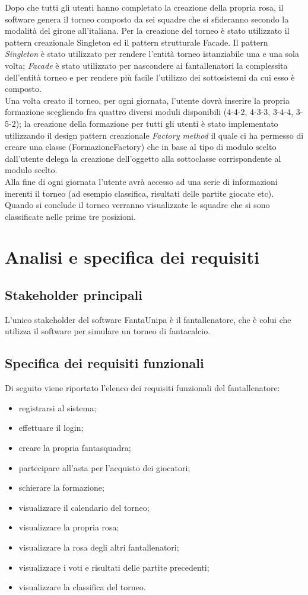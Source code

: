 \documentclass[12pt,a4paper]{article}
\begin{document}
Dopo che tutti gli utenti hanno completato la creazione della propria rosa, il software genera il torneo composto da sei squadre che si sfideranno secondo la modalità del girone all'italiana. Per la creazione del torneo è stato utilizzato il pattern creazionale Singleton ed il pattern strutturale Facade. Il pattern \textit{Singleton} è stato utilizzato per rendere l'entità torneo istanziabile una e una sola volta; \textit{Facade} è stato utilizzato per nascondere ai fantallenatori la  complessita dell'entità torneo e per rendere più facile l'utilizzo dei sottosistemi da cui esso è composto.\\
Una volta creato il torneo, per ogni giornata, l'utente dovrà inserire la propria formazione scegliendo fra quattro diversi moduli disponibili (4-4-2, 4-3-3, 3-4-4, 3-5-2); la creazione della formazione per tutti gli utenti è stato implementato utilizzando il design pattern creazionale \textit{Factory method} il quale ci ha permesso di creare una classe (FormazioneFactory) che in base al tipo di modulo scelto dall'utente delega la creazione dell'oggetto alla sottoclasse corrispondente al modulo scelto.\\
Alla fine di ogni giornata l'utente avrà accesso ad una serie di informazioni inerenti il torneo (ad esempio classifica, risultati delle partite giocate etc).\\ Quando si conclude il torneo verranno visualizzate le squadre che si sono classificate nelle prime tre posizioni.
\section{Analisi e specifica dei requisiti}
\subsection{Stakeholder principali}
L'unico stakeholder del software FantaUnipa è il fantallenatore, che è colui che utilizza il software per simulare un torneo di fantacalcio. 
\subsection{Specifica dei requisiti funzionali}
Di seguito viene riportato l'elenco dei requisiti funzionali del fantallenatore:
\begin{itemize}
\item registrarsi al sistema;
\item effettuare il login;
\item creare la propria fantasquadra;
\item partecipare all'asta per l'acquisto dei giocatori;
\item schierare la formazione;
\item visualizzare il calendario del torneo;
\item visualizzare la propria rosa;
\item visualizzare la rosa degli altri fantallenatori;
\item visualizzare i voti e risultati delle partite precedenti;
\item visualizzare la classifica del torneo.
\end{itemize}
\end{document}

